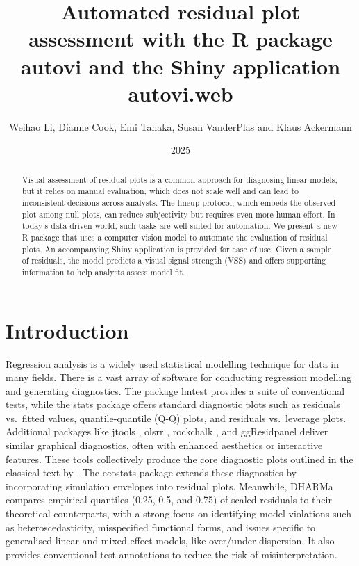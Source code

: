 \documentclass[
doublespace,
  times]{anzsauth}
\title{Automated residual plot assessment with the \textsf{R} package
\textsf{autovi} and the \textsf{Shiny} application \textsf{autovi.web}}
\author{
Weihao Li\addressnum{1, 2},
Dianne Cook\addressnum{1},
Emi Tanaka\addressnum{2},
Susan VanderPlas\addressnum{3} and
Klaus Ackermann\addressnum{1}
}
\affiliation{
Monash University,
The Australian National University and
University of Nebraska
}
\date{2025}
\begin{document}
\begin{abstract}
Visual assessment of residual plots is a common approach for diagnosing
linear models, but it relies on manual evaluation, which does not scale
well and can lead to inconsistent decisions across analysts. The lineup
protocol, which embeds the observed plot among null plots, can reduce
subjectivity but requires even more human effort. In today's data-driven
world, such tasks are well-suited for automation. We present a new
\textsf{R} package that uses a computer vision model to automate the
evaluation of residual plots. An accompanying \textsf{Shiny} application
is provided for ease of use. Given a sample of residuals, the model
predicts a visual signal strength (VSS) and offers supporting
information to help analysts assess model fit.
\end{abstract}

          

\maketitle


\section{Introduction}\label{sec-autovi-introduction}

Regression analysis is a widely used statistical modelling technique for
data in many fields. There is a vast array of software for conducting
regression modelling and generating diagnostics. The package
\textsf{lmtest} \citep{lmtest} provides a suite of conventional tests,
while the \textsf{stats} package \citep{stats} offers standard
diagnostic plots such as residuals vs.~fitted values, quantile-quantile
(Q-Q) plots, and residuals vs.~leverage plots. Additional packages like
\textsf{jtools} \citep{jtools}, \textsf{olsrr} \citep{olsrr},
\textsf{rockchalk} \citep{rockchalk}, and \textsf{ggResidpanel}
\citep{ggresidpanel} deliver similar graphical diagnostics, often with
enhanced aesthetics or interactive features. These tools collectively
produce the core diagnostic plots outlined in the classical text by
\citet{cook1982residuals}. The \textsf{ecostats} package
\citep{warton_global_2023} extends these diagnostics by incorporating
simulation envelopes into residual plots. Meanwhile, \textsf{DHARMa}
\citep{dharma} compares empirical quantiles (0.25, 0.5, and 0.75) of
scaled residuals to their theoretical counterparts, with a strong focus
on identifying model violations such as heteroscedasticity, misspecified
functional forms, and issues specific to generalised linear and
mixed-effect models, like over/under-dispersion. It also provides
conventional test annotations to reduce the risk of misinterpretation.
\end{document}
